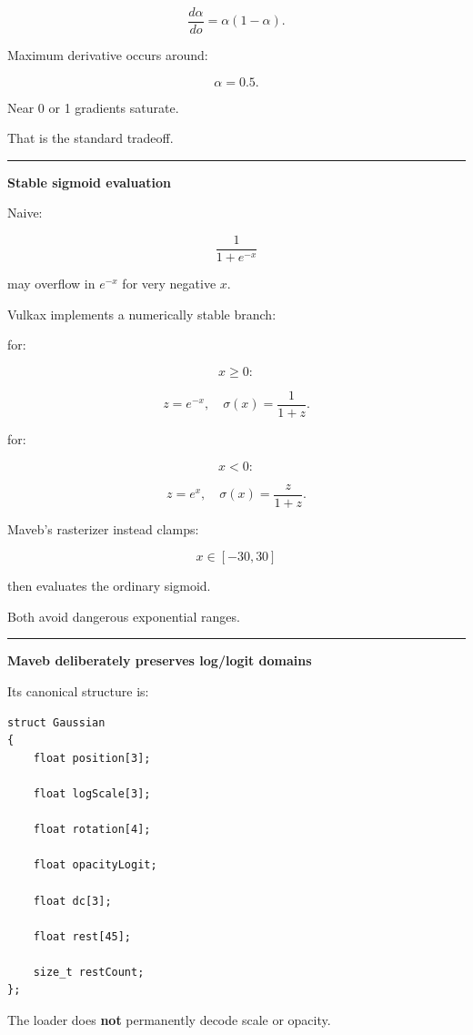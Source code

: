 \[
\boxed{
\frac{d\alpha}{do}
=
\alpha(1-\alpha).
}
\]

Maximum derivative occurs around:

\[
\alpha=0.5.
\]

Near 0 or 1 gradients saturate.

That is the standard tradeoff.

\begin{center}\rule{0.5\linewidth}{0.5pt}\end{center}

\textbf{Stable sigmoid evaluation}

Naive:

\[
\frac1{1+e^{-x}}
\]

may overflow in \(e^{-x}\) for very negative \(x\).

Vulkax implements a numerically stable branch:

for:

\[
x\ge0:
\]

\[
z=e^{-x},
\quad
\sigma(x)=\frac1{1+z}.
\]

for:

\[
x<0:
\]

\[
z=e^x,
\quad
\sigma(x)=\frac{z}{1+z}.
\]

Maveb's rasterizer instead clamps:

\[
x\in[-30,30]
\]

then evaluates the ordinary sigmoid.

Both avoid dangerous exponential ranges.

\begin{center}\rule{0.5\linewidth}{0.5pt}\end{center}

\textbf{Maveb deliberately preserves log/logit domains}

Its canonical structure is:

\begin{verbatim}
struct Gaussian
{
    float position[3];

    float logScale[3];

    float rotation[4];

    float opacityLogit;

    float dc[3];

    float rest[45];

    size_t restCount;
};
\end{verbatim}

The loader does \textbf{not} permanently decode scale or opacity.

